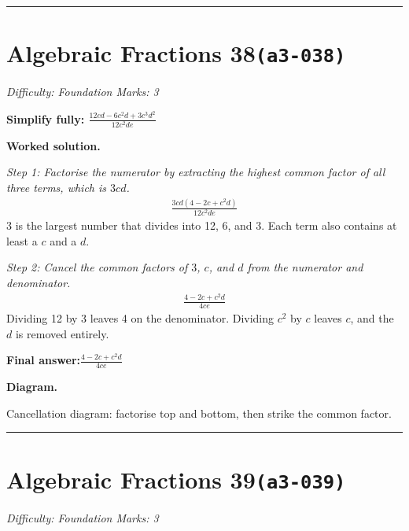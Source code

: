 \documentclass[11pt]{article}
\newcommand{\question}[1]{\par\medskip\noindent\textbf{#1}\par}
\begin{document}
\medskip\hrule

\section*{Algebraic Fractions 38\quad\small\texttt{(a3-038)}}
\textit{Difficulty: Foundation \quad\textbar\quad Marks: 3}

\question{Simplify fully: \( \frac{12cd - 6c^2d + 3c^3d^2}{12c^2de} \)}

\textbf{Worked solution.}

\textit{Step 1: Factorise the numerator by extracting the highest common factor of all three terms, which is \( 3cd \).}
\[\begin{gathered}
\frac{3cd(4 - 2c + c^2d)}{12c^2de}
\end{gathered}\]
3 is the largest number that divides into 12, 6, and 3. Each term also contains at least a \( c \) and a \( d \).

\textit{Step 2: Cancel the common factors of \( 3 \), \( c \), and \( d \) from the numerator and denominator.}
\[\begin{gathered}
\frac{4 - 2c + c^2d}{4ce}
\end{gathered}\]
Dividing 12 by 3 leaves 4 on the denominator. Dividing \( c^2 \) by \( c \) leaves \( c \), and the \( d \) is removed entirely.

\begin{answerbox}
\textbf{Final answer:}\quad \(\displaystyle \frac{4 - 2c + c^2d}{4ce}\)
\end{answerbox}
\textbf{Diagram.}

\begin{center}
\end{center}
\small Cancellation diagram: factorise top and bottom, then strike the common factor.\normalsize

\medskip\hrule

\section*{Algebraic Fractions 39\quad\small\texttt{(a3-039)}}
\textit{Difficulty: Foundation \quad\textbar\quad Marks: 3}
\end{document}
